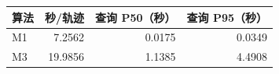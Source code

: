 \begin{tabular}{lrrr}
\toprule
算法 & 秒/轨迹 & 查询 P50（秒） & 查询 P95（秒） \\
\midrule
M1 & 7.2562 & 0.0175 & 0.0349 \\
M3 & 19.9856 & 1.1385 & 4.4908 \\
\bottomrule
\end{tabular}
